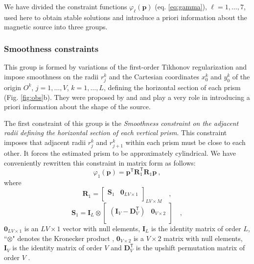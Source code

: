 We have divided the constraint functions $\varphi_{\ell}(\mathbf{p})$ (eq. \ref{eq:gamma}), $\ell = 1, \dots, 7$, used here to 
obtain stable solutions and introduce a priori information about the magnetic source into three groups.



\subsubsection{Smoothness constraints}

This group is formed by variations of the first-order Tikhonov regularization \citep[][ p. 103]{aster-etal2019}
and impose smoothness on the radii $r_{j}^{k}$ and the Cartesian coordinates $x_{0}^{k}$ and $y_{0}^{k}$ of the origin 
$O^{k}$, $j = 1, \dots, V$, $k = 1, \dots, L$, defining the horizontal section of each prism (Fig. \ref{fig:obs}b).
They were proposed by \citet{oliveirajr-etal2011} and \citet{oliveirajr-barbosa2013} and play a very 
role in introducing a priori information about the shape of the source. 

The first constraint of this group is the \textit{Smoothness constraint on the adjacent radii defining the horizontal 
section of each vertical prism}. This constraint imposes that adjacent radii $r_{j}^{k}$ and $r_{j+1}^{k}$ within each 
prism must be close to each other. It forces the estimated prism to be approximately cylindrical. 
We have conveniently rewritten this constraint in matrix form as follows:
\begin{equation}
\varphi_{1}(\mathbf{p}) = \mathbf{p}^{\mathsf{T}} \mathbf{R}^{\mathsf{T}}_{1}\mathbf{R}_{1} \mathbf{p} \: ,
\label{eq:phi1}
\end{equation}
where 
\begin{equation}
\mathbf{R}_{1} = \begin{bmatrix} 
\mathbf{S}_{1} & \mathbf{0}_{LV \times 1} \\
\end{bmatrix}_{LV \times M} \quad ,
\label{eq:R1-matrix}
\end{equation}
\begin{equation}
\mathbf{S}_{1} = 
\mathbf{I}_{L} \otimes 
\begin{bmatrix}
\left( \mathbf{I}_{V} - \mathbf{D}_{V}^\mathsf{T} \right) & \mathbf{0}_{V \times 2} \\
\end{bmatrix} \quad ,
\label{eq:S1-matrix}
\end{equation}
$\mathbf{0}_{LV \times 1}$ is an $LV \times 1$ vector with null elements, 
$\mathbf{I}_{L}$ is the identity matrix of order $L$, ``$\otimes$" denotes the Kronecker product 
\citep[][ p. 243]{horn_johnson1991}, $\mathbf{0}_{V \times 2}$ is a $V \times 2$ matrix with null elements, 
$\mathbf{I}_{V}$ is the identity matrix of order $V$ and $\mathbf{D}_{V}^\mathsf{T}$ is the upshift permutation 
matrix of order $V$ \citep[][ p. 20]{golub-vanloan2013}.

